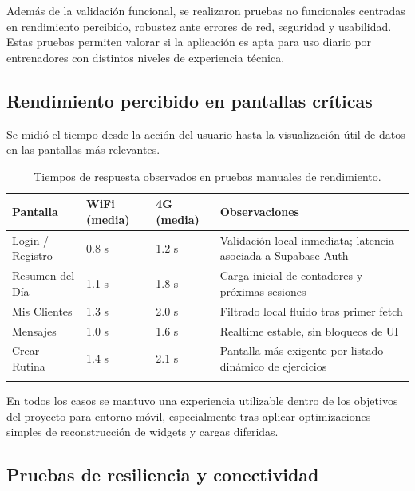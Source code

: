 Además de la validación funcional, se realizaron pruebas no funcionales centradas en rendimiento percibido, robustez ante errores de red, seguridad y usabilidad. Estas pruebas permiten valorar si la aplicación es apta para uso diario por entrenadores con distintos niveles de experiencia técnica.

\subsection{Rendimiento percibido en pantallas críticas}

Se midió el tiempo desde la acción del usuario hasta la visualización útil de datos en las pantallas más relevantes.

\begin{longtable}{@{}p{4cm}p{3cm}p{3cm}p{4cm}@{}}
\toprule
\textbf{Pantalla} & \textbf{WiFi (media)} & \textbf{4G (media)} & \textbf{Observaciones} \\
\midrule
\endhead
Login / Registro & 0.8 s & 1.2 s & Validación local inmediata; latencia asociada a Supabase Auth \\
Resumen del Día & 1.1 s & 1.8 s & Carga inicial de contadores y próximas sesiones \\
Mis Clientes & 1.3 s & 2.0 s & Filtrado local fluido tras primer fetch \\
Mensajes & 1.0 s & 1.6 s & Realtime estable, sin bloqueos de UI \\
Crear Rutina & 1.4 s & 2.1 s & Pantalla más exigente por listado dinámico de ejercicios \\
\bottomrule
\caption{Tiempos de respuesta observados en pruebas manuales de rendimiento.}
\end{longtable}

En todos los casos se mantuvo una experiencia utilizable dentro de los objetivos del proyecto para entorno móvil, especialmente tras aplicar optimizaciones simples de reconstrucción de widgets y cargas diferidas.

\subsection{Pruebas de resiliencia y conectividad}

